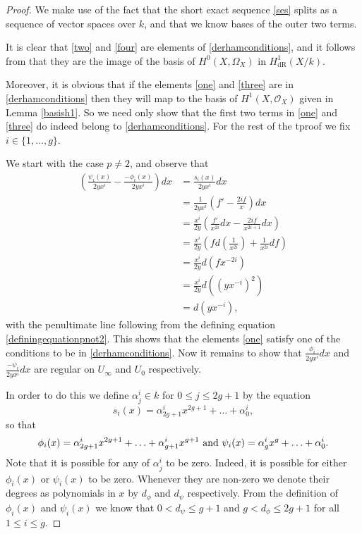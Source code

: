 \documentclass[draft, 11pt]{article} %
\theoremstyle{plain}
\theoremstyle{remark}
\newcommand{\hone}{H^1(X,\mathcal{O}_X)}
\newcommand{\derhamhone}{H_{\text {dR}}^1(X/k)}
\begin{document}
\begin{proof}
We make use of the fact that the short exact sequence \eqref{ses} splits as a sequence of vector spaces over $k$, and that we know bases of the outer two terms.

It is clear that \eqref{two} and \eqref{four} are elements of \eqref{derhamconditions}, and it follows from \cite[Thm 6.1]{faithfulaction} that they are the image of the basis of $H^0(X,\Omega_X)$ in $\derhamhone$.

Moreover, it is obvious that if the elements \eqref{one} and \eqref{three} are in \eqref{derhamconditions} then they will map to the basis of $\hone$ given in Lemma \ref{basish1}.
So we need only show that the first two terms in \eqref{one} and \eqref{three} do indeed belong to \eqref{derhamconditions}.
For the rest of the tproof we fix $i \in \{1, \ldots ,g\}$.


We start with the case $p\neq 2$, and observe that
\begin{align*}
\left(  \frac{\psi_i(x)}{2yx^i}  - \frac{-\phi_i(x)}{2yx^i} \right) dx & =  \frac{s_i(x)}{2yx^i} dx \\
& =  \frac{1}{2yx^i} \left( f' - \frac{2if}{x} \right) dx \\
& =  \frac{x^i}{2y} \left( \frac{f'}{x^{2i}}dx -\frac{2if}{x^{2i+1}} dx \right) \\
& =  \frac{x^i}{2y} \left( fd\left(\frac{1}{x^{2i}}\right) + \frac{1}{x^{2i}}df \right) \\
& =  \frac{x^i}{2y}d(fx^{-2i}) \\
& =  \frac{x^i}{2y} d\left(\left(yx^{-i}\right)^2\right) \\
& =  d(yx^{-i}),
\end{align*}
with the penultimate line following from the defining equation \eqref{definingequationpnot2}.
This shows that the elements \eqref{one} satisfy one of the conditions to be in \eqref{derhamconditions}.
Now it remains to show that $\frac{\phi_i}{2yx^i}dx$ and $\frac{-\psi_i}{2yx^i}dx$ are regular on $U_\infty$ and $U_0$ respectively.


In order to do this we define $\alpha^i_j \in k$ for $0\leq j \leq 2g+1$ by the equation
\[
s_i(x) = \alpha^i_{2g+1}x^{2g+1} + \ldots + \alpha^i_0,
\]
so that
\[
\phi_i(x) = \alpha^i_{2g+1}x^{2g+1} + \ldots + \alpha^i_{g+1}x^{g+1} \ {\rm and } \ \psi_i(x) = \alpha^i_gx^g + \ldots + \alpha^i_0.
\]
Note that it is possible for any of $\alpha^i_j$ to be zero. Indeed, it is possible for either $\phi_i(x)$ or $\psi_i(x)$ to be zero.
Whenever they are non-zero we denote their degrees as polynomials in $x$ by $d_\phi$ and $d_\psi$ respectively. From the definition of $\phi_i(x)$ and $\psi_i(x)$ we know that $0 < d_\psi \leq g+1$ and $g < d_\phi \leq 2g+1$ for all $1 \leq i \leq g$.



\end{proof}
\end{document}
